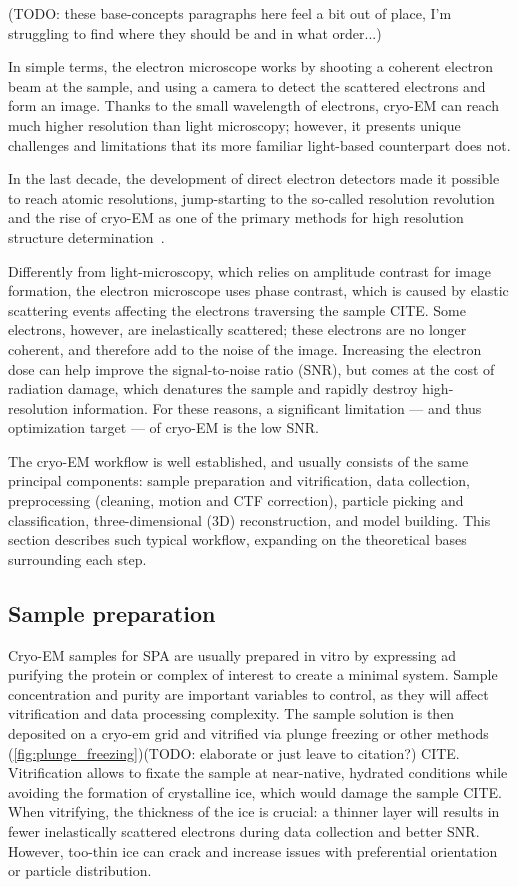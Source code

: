 (TODO: these base-concepts paragraphs here feel a bit out of place, I'm struggling to find where they should be and in what order...)

In simple terms, the electron microscope works by shooting a coherent electron beam at the sample, and using a camera to detect the scattered electrons and form an image. Thanks to the small wavelength of electrons, cryo-EM can reach much higher resolution than light microscopy; however, it presents unique challenges and limitations that its more familiar light-based counterpart does not.

In the last decade, the development of direct electron detectors made it possible to reach atomic resolutions, jump-starting to the so-called resolution revolution and the rise of cryo-EM as one of the primary methods for high resolution structure determination~\cite{faruqiCCDDetectorsHighresolution2000}.

Differently from light-microscopy, which relies on amplitude contrast for image formation, the electron microscope uses phase contrast, which is caused by elastic scattering events affecting the electrons traversing the sample CITE. Some electrons, however, are inelastically scattered; these electrons are no longer coherent, and therefore add to the noise of the image. Increasing the electron dose can help improve the signal-to-noise ratio (SNR), but comes at the cost of radiation damage, which denatures the sample and rapidly destroy high-resolution information. For these reasons, a significant limitation --- and thus optimization target --- of cryo-EM is the low SNR.

The cryo-EM workflow is well established, and usually consists of the same principal components: sample preparation and vitrification, data collection, preprocessing (cleaning, motion and CTF correction), particle picking and classification, three-dimensional (3D) reconstruction, and model building. This section describes such typical workflow, expanding on the theoretical bases surrounding each step.

\subsection{Sample preparation}
Cryo-EM samples for SPA are usually prepared in vitro by expressing ad purifying the protein or complex of interest to create a minimal system. Sample concentration and purity are important variables to control, as they will affect vitrification and data processing complexity. The sample solution is then deposited on a cryo-em grid and vitrified via plunge freezing or other methods (\autoref{fig:plunge_freezing})(TODO: elaborate or just leave to citation?) CITE. Vitrification allows to fixate the sample at near-native, hydrated conditions while avoiding the formation of crystalline ice, which would damage the sample CITE. When vitrifying, the thickness of the ice is crucial: a thinner layer will results in fewer inelastically scattered electrons during data collection and better SNR. However, too-thin ice can crack and increase issues with preferential orientation or particle distribution.

